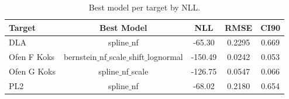 \begin{table}[t]
\centering
\caption{Best model per target by NLL.}
\label{tab:cross_target_winners}
\small
\begin{tabular}{lcccc}
\toprule
Target & Best Model & NLL & RMSE & CI90 \\
\midrule
  DLA & spline$\_$nf & -65.30 & 0.2295 & 0.669 \\
  Ofen F Koks & bernstein$\_$nf$\_$scale$\_$shift$\_$lognormal & -150.49 & 0.0242 & 0.053 \\
  Ofen G Koks & spline$\_$nf$\_$scale & -126.75 & 0.0547 & 0.066 \\
  PL2 & spline$\_$nf & -68.02 & 0.2180 & 0.654 \\
\bottomrule
\end{tabular}
\end{table}
